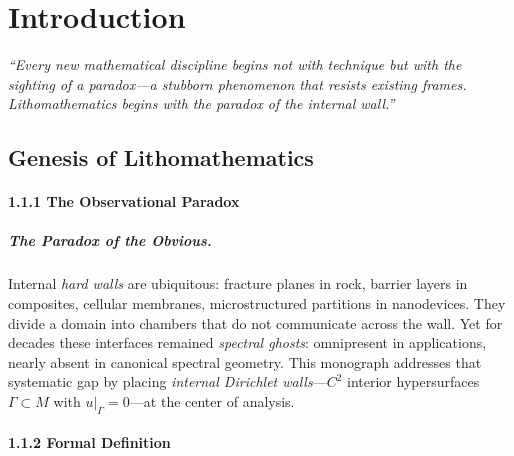 \chapter{Introduction}

\begin{center}
\emph{``Every new mathematical discipline begins not with technique but with the sighting of a paradox---a stubborn phenomenon that resists existing frames. Lithomathematics begins with the paradox of the internal wall.''}
\end{center}

\section{Genesis of Lithomathematics}\label{sec:genesis}

\subsubsection*{1.1.1 The Observational Paradox}
\paragraph{The Paradox of the Obvious.}
Internal \emph{hard walls} are ubiquitous: fracture planes in rock, barrier layers in composites, cellular membranes, microstructured partitions in nanodevices.
They divide a domain into chambers that do not communicate across the wall.
Yet for decades these interfaces remained \emph{spectral ghosts}: omnipresent in applications, nearly absent in canonical spectral geometry.
This monograph addresses that systematic gap by placing \emph{internal Dirichlet walls}—$C^2$ interior hypersurfaces $\Gamma\subset M$ with $u|_\Gamma=0$—at the center of analysis.

\subsubsection*{1.1.2 Formal Definition}
